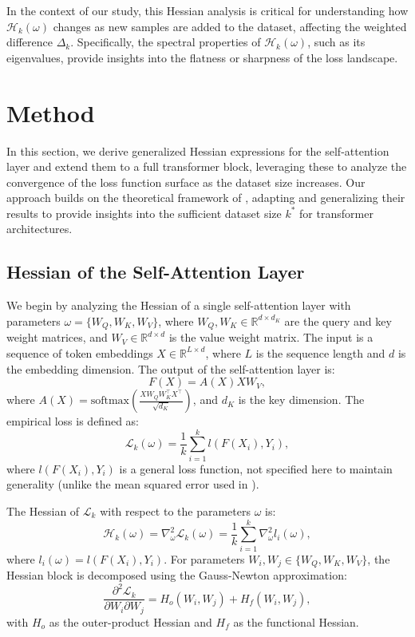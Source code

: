 \documentclass{article}
\begin{document}
In the context of our study, this Hessian analysis is critical for understanding how $\mathcal{H}_k(\omega)$ changes as new samples are added to the dataset, affecting the weighted difference $\Delta_k$. Specifically, the spectral properties of $\mathcal{H}_k(\omega)$, such as its eigenvalues, provide insights into the flatness or sharpness of the loss landscape.

\section{Method}\label{sec:method}

In this section, we derive generalized Hessian expressions for the self-attention layer and extend them to a full transformer block, leveraging these to analyze the convergence of the loss function surface as the dataset size increases. Our approach builds on the theoretical framework of \cite{ormaniec2024attentionhessian}, adapting and generalizing their results to provide insights into the sufficient dataset size \( k^* \) for transformer architectures.

\subsection{Hessian of the Self-Attention Layer}\label{subsec:hessian_self_attention}

We begin by analyzing the Hessian of a single self-attention layer with parameters \( \omega = \{W_Q, W_K, W_V\} \), where \( W_Q, W_K \in \mathbb{R}^{d \times d_K} \) are the query and key weight matrices, and \( W_V \in \mathbb{R}^{d \times d} \) is the value weight matrix. The input is a sequence of token embeddings \( X \in \mathbb{R}^{L \times d} \), where \( L \) is the sequence length and \( d \) is the embedding dimension. The output of the self-attention layer is:
\[
F(X) = A(X) X W_V,
\]
where \( A(X) = \text{softmax}\left( \frac{X W_Q W_K^\top X^\top}{\sqrt{d_K}} \right) \), and \( d_K \) is the key dimension. The empirical loss is defined as:
\[
\mathcal{L}_k(\omega) = \frac{1}{k} \sum_{i=1}^k l(F(X_i), Y_i),
\]
where \( l(F(X_i), Y_i) \) is a general loss function, not specified here to maintain generality (unlike the mean squared error used in \cite{ormaniec2024attentionhessian}).

The Hessian of \( \mathcal{L}_k \) with respect to the parameters \( \omega \) is:
\[
\mathcal{H}_k(\omega) = \nabla^2_\omega \mathcal{L}_k(\omega) = \frac{1}{k} \sum_{i=1}^k \nabla^2_\omega l_i(\omega),
\]
where \( l_i(\omega) = l(F(X_i), Y_i) \). For parameters \( W_i, W_j \in \{W_Q, W_K, W_V\} \), the Hessian block is decomposed using the Gauss-Newton approximation:
\[
\frac{\partial^2 \mathcal{L}_k}{\partial W_i \partial W_j} = H_o(W_i, W_j) + H_f(W_i, W_j),
\]
with \( H_o \) as the outer-product Hessian and \( H_f \) as the functional Hessian.
\end{document}
